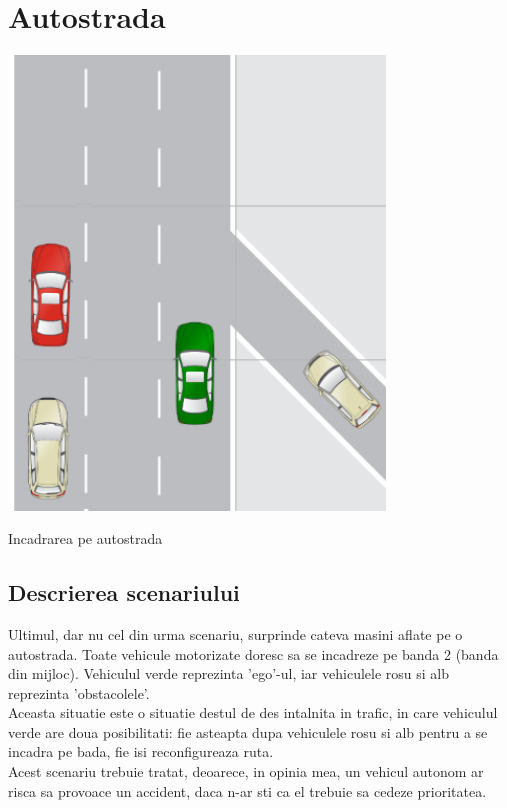 \documentclass[a4paper,12pt]{report}
\begin{document}
\newpage


\chapter{Autostrada}

\begin{center}
\includegraphics[width=10cm]{fig/scenariul3}
\end{center}
\begin{center}
Incadrarea pe autostrada
\end{center}

\section{Descrierea scenariului}
Ultimul, dar nu cel din urma scenariu, surprinde cateva masini aflate pe o autostrada. Toate vehicule motorizate doresc sa se incadreze pe banda 2 (banda din mijloc). Vehiculul verde reprezinta 'ego'-ul, iar vehiculele rosu si alb reprezinta 'obstacolele'. \\
Aceasta situatie este o situatie destul de des intalnita in trafic, in care vehiculul verde are doua posibilitati: fie asteapta dupa vehiculele rosu si alb pentru a se incadra pe bada, fie isi reconfigureaza ruta.\\
Acest scenariu trebuie tratat, deoarece, in opinia mea, un vehicul autonom ar risca sa provoace un accident, daca n-ar sti ca el trebuie sa cedeze prioritatea.\\
\end{document}
